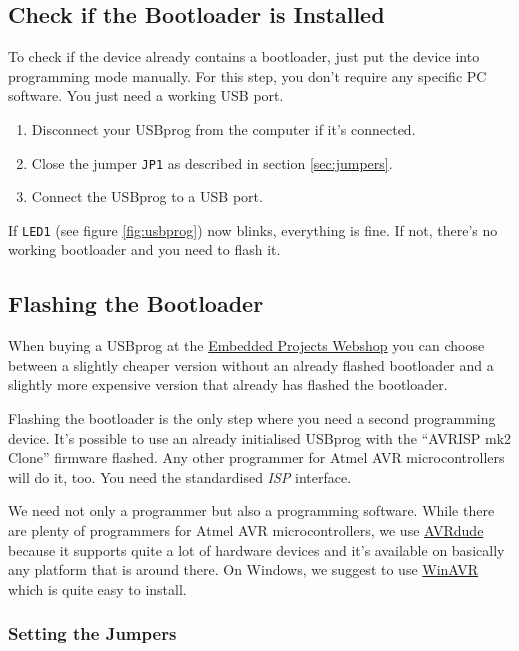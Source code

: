 \documentclass[bibtotoc,UKenglish,halfparskip,oneside,DIV12]{scrreprt}
\begin{document}
\subsection{Check if the Bootloader is Installed}
\label{sec:check_if_bootloader_installed}

To check if the device already contains a bootloader, just put the device into programming mode
manually. For this step, you don't require any specific PC software. You just need a working USB
port.

\begin{enumerate}
  \item Disconnect your USBprog from the computer if it's connected.
  \item Close the jumper \texttt{JP1} as described in section \vref{sec:jumpers}.
  \item Connect the USBprog to a USB port.
\end{enumerate}

If \texttt{LED1} (see figure \vref{fig:usbprog}) now blinks, everything is fine. If not, there's no
working bootloader and you need to flash it.


\subsection{Flashing the Bootloader}

When buying a USBprog at the \href{http://www.eproo.net}{Embedded Projects Webshop} you can choose
between a slightly cheaper version without an already flashed bootloader and a slightly more
expensive version that already has flashed the bootloader.

Flashing the bootloader is the only step where you need a second programming device. It's possible
to use an already initialised USBprog with the ``AVRISP mk2 Clone'' firmware flashed. Any other
programmer for Atmel AVR microcontrollers will do it, too. You need the standardised \emph{ISP}
interface.

We need not only a programmer but also a programming software. While there are plenty of programmers
for Atmel AVR microcontrollers, we use \href{http://www.nongnu.org/avrdude/}{AVRdude} because it
supports quite a lot of hardware devices and it's available on basically any platform that is around
there. On Windows, we suggest to use \href{http://winavr.sourceforge.net/}{WinAVR} which is quite
easy to install.

\subsubsection{Setting the Jumpers}
\end{document}
